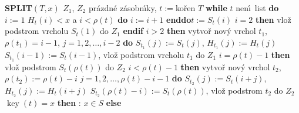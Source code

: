 \documentclass[a4paper,12pt]{article}
\DeclareMathOperator*{\key}{key}
\begin{document}
{\bf SPLIT$(T,x)$\newline 
$Z_1$}, $Z_2$ pr\'azdn\'e z\'asobn\'\i ky, $t:=$ko\v ren $T$\newline 
{\bf while} $t$ nen\'\i\ list {\bf do}\newline
\phantom{---}$i:=1$\newline 
\phantom{---}{\bf while} $H_t(i)<x$ a $i<\rho (t)$ {\bf do} $i:=i+1$ {\bf enddo}\newline \phantom{---}$t:=S_t(i)$\newline 
\phantom{---}{\bf if} $i=2$ {\bf then} vlo\v z podstrom vrcholu $S_t(1)$ do $Z_1$ 
{\bf endif}\newline 
\phantom{---}{\bf if} $i>2$ {\bf then}\newline 
\phantom{------}vytvo\v r nov\'y vrchol $t_1$, $\rho (t_1)=i-1$,\newline 
\phantom{------}{\bf for every} $j=1,2,\dots,i-2$ {\bf do}\newline 
\phantom{---------}$S_{t_1}(j):=S_t(j)$, $H_{t_1}(j):=H_t(j)$\newline 
\phantom{------}{\bf enddo}\newline 
\phantom{------}$S_{t_1}(i-1):=S_t(i-1)$, vlo\v z podstrom vrcholu $t_1$ do $Z_1$\newline 
\phantom{---}{\bf endif}\newline 
\phantom{---}{\bf if} $i=\rho (t)-1$ {\bf then}\newline 
\phantom{------}vlo\v z podstrom $S_t(\rho (t))$ do $Z_2$ 
\phantom{---}{\bf endif}\newline 
\phantom{---}{\bf if} $i<\rho (t)-1$ {\bf then}\newline 
\phantom{------}vytvo\v r nov\'y vrchol $t_2$, $\rho (t_2):=\rho (t)-i$\newline 
\phantom{------}{\bf for every} $j=1,2,\dots,\rho (t)-i-1$ {\bf do}\newline 
\phantom{---------}$S_{t_2}(j):=S_t(i+j)$, $H_{t_2}(j):=H_t(i+j)$\newline 
\phantom{------}{\bf enddo}\newline 
\phantom{------}$S_{t_2}(\rho (t)-i):=S_t(\rho (t))$, vlo\v z podstrom $t_2$ do $Z_2$ \newline 
\phantom{---}{\bf endif\newline 
enddo\newline 
if} $\key(t)=x$ {\bf then}\newline 
\phantom{---}{\bf V\'ystup}: $x\in S$\newline 
{\bf else}\newline 
\end{document}
